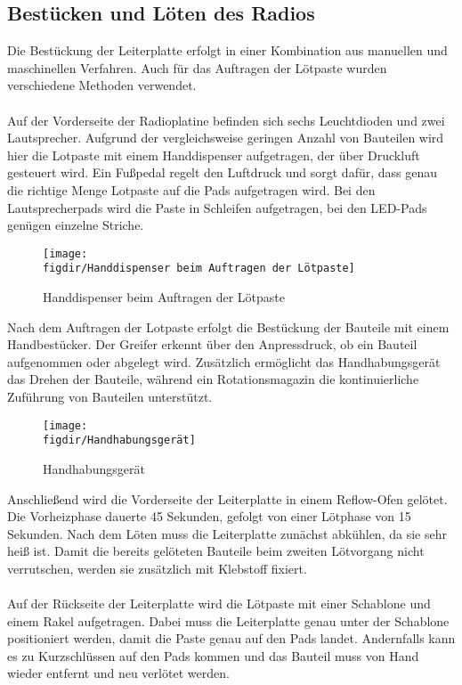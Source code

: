 \subsection{Bestücken und Löten des Radios}
Die Bestückung der Leiterplatte erfolgt in einer Kombination aus manuellen und maschinellen Verfahren.
Auch für das Auftragen der Lötpaste wurden verschiedene Methoden verwendet.\\
\\
Auf der Vorderseite der Radioplatine befinden sich sechs Leuchtdioden und zwei Lautsprecher.
Aufgrund der vergleichsweise geringen Anzahl von Bauteilen wird hier die Lotpaste mit einem Handdispenser aufgetragen, der über Druckluft gesteuert wird.
Ein Fußpedal regelt den Luftdruck und sorgt dafür, dass genau die richtige Menge Lotpaste auf die Pads aufgetragen wird.
Bei den Lautsprecherpads wird die Paste in Schleifen aufgetragen, bei den LED-Pads genügen einzelne Striche.

\begin{figure}[H]
    \centering
    \texttt{[image: \\figdir/Handdispenser beim Auftragen der Lötpaste]}
    \caption{Handdispenser beim Auftragen der Lötpaste}
    \label{fig:fig: Abbildung 13}
\end{figure}

\noindent
Nach dem Auftragen der Lotpaste erfolgt die Bestückung der Bauteile mit einem Handbestücker.
Der Greifer erkennt über den Anpressdruck, ob ein Bauteil aufgenommen oder abgelegt wird.
Zusätzlich ermöglicht das Handhabungsgerät das Drehen der Bauteile, während ein Rotationsmagazin die kontinuierliche Zuführung von Bauteilen unterstützt.

\begin{figure}[H]
    \centering
    \texttt{[image: \\figdir/Handhabungsgerät]}
    \caption{Handhabungsgerät}
    \label{fig:fig: Abbildung 14}
\end{figure}

\newpage
\noindent
Anschließend wird die Vorderseite der Leiterplatte in einem Reflow-Ofen gelötet.
Die Vorheizphase dauerte 45 Sekunden, gefolgt von einer Lötphase von 15 Sekunden. Nach dem Löten muss die Leiterplatte zunächst abkühlen, da sie sehr heiß ist.
Damit die bereits gelöteten Bauteile beim zweiten Lötvorgang nicht verrutschen, werden sie zusätzlich mit Klebstoff fixiert.\\
\\
Auf der Rückseite der Leiterplatte wird die Lötpaste mit einer Schablone und einem Rakel aufgetragen.
Dabei muss die Leiterplatte genau unter der Schablone positioniert werden, damit die Paste genau auf den Pads landet.
Andernfalls kann es zu Kurzschlüssen auf den Pads kommen und das Bauteil muss von Hand wieder entfernt und neu verlötet werden.

